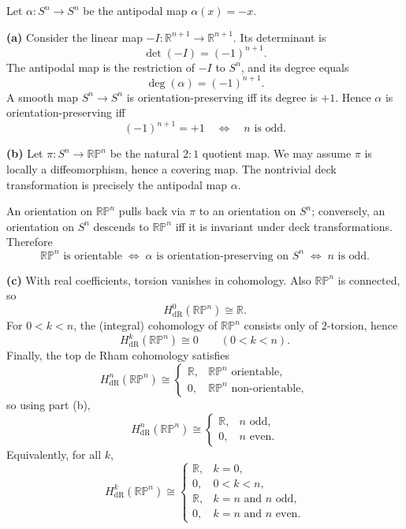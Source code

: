 \begin{solution}
Let $\alpha:S^n\to S^n$ be the antipodal map $\alpha(x)=-x$.
	
	\textbf{(a)} Consider the linear map $-I:\mathbb{R}^{n+1}\to\mathbb{R}^{n+1}$. Its determinant is
	\[
	\det(-I)=(-1)^{n+1}.
	\]
	The antipodal map is the restriction of $-I$ to $S^n$, and its degree equals
	\[
	\deg(\alpha)=(-1)^{n+1}.
	\]
	A smooth map $S^n\to S^n$ is orientation-preserving iff its degree is $+1$. Hence $\alpha$ is orientation-preserving iff
	\[
	(-1)^{n+1}=+1 \quad \Longleftrightarrow \quad n \text{ is odd.}
	\]
	
	\textbf{(b)} Let $\pi:S^n\to \mathbb{RP}^n$ be the natural $2:1$ quotient map. We may assume $\pi$ is locally a diffeomorphism, hence a covering map. The nontrivial deck transformation is precisely the antipodal map $\alpha$.
	
	An orientation on $\mathbb{RP}^n$ pulls back via $\pi$ to an orientation on $S^n$; conversely, an orientation on $S^n$ descends to $\mathbb{RP}^n$ iff it is invariant under deck transformations. Therefore
	\[
	\mathbb{RP}^n \text{ is orientable}
	\;\Longleftrightarrow\;
	\alpha \text{ is orientation-preserving on } S^n
	\;\Longleftrightarrow\;
	n \text{ is odd.}
	\]
	
	\textbf{(c)} With real coefficients, torsion vanishes in cohomology. Also $\mathbb{RP}^n$ is connected, so
	\[
	H^0_{\mathrm{dR}}(\mathbb{RP}^n)\cong \mathbb{R}.
	\]
	For $0<k<n$, the (integral) cohomology of $\mathbb{RP}^n$ consists only of $2$-torsion, hence
	\[
	H^k_{\mathrm{dR}}(\mathbb{RP}^n)\cong 0 \qquad (0<k<n).
	\]
	Finally, the top de Rham cohomology satisfies
	\[
	H^n_{\mathrm{dR}}(\mathbb{RP}^n)\cong
	\begin{cases}
		\mathbb{R}, & \mathbb{RP}^n \text{ orientable},\\
		0, & \mathbb{RP}^n \text{ non-orientable},
	\end{cases}
	\]
	so using part (b),
	\[
	H^n_{\mathrm{dR}}(\mathbb{RP}^n)\cong
	\begin{cases}
		\mathbb{R}, & n \text{ odd},\\
		0, & n \text{ even}.
	\end{cases}
	\]
	Equivalently, for all $k$,
	\[
	H^k_{\mathrm{dR}}(\mathbb{RP}^n)\cong
	\begin{cases}
		\mathbb{R}, & k=0,\\
		0, & 0<k<n,\\
		\mathbb{R}, & k=n \text{ and } n \text{ odd},\\
		0, & k=n \text{ and } n \text{ even}.
	\end{cases}
	\]
	

\end{solution}
